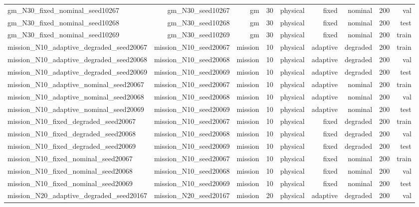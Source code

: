 \begin{tabular}{lrrrrrrrr}
gm\_N30\_fixed\_nominal\_seed10267 & gm\_N30\_seed10267 & gm & 30 & physical & fixed & nominal & 200 & val \\
gm\_N30\_fixed\_nominal\_seed10268 & gm\_N30\_seed10268 & gm & 30 & physical & fixed & nominal & 200 & test \\
gm\_N30\_fixed\_nominal\_seed10269 & gm\_N30\_seed10269 & gm & 30 & physical & fixed & nominal & 200 & train \\
mission\_N10\_adaptive\_degraded\_seed20067 & mission\_N10\_seed20067 & mission & 10 & physical & adaptive & degraded & 200 & train \\
mission\_N10\_adaptive\_degraded\_seed20068 & mission\_N10\_seed20068 & mission & 10 & physical & adaptive & degraded & 200 & val \\
mission\_N10\_adaptive\_degraded\_seed20069 & mission\_N10\_seed20069 & mission & 10 & physical & adaptive & degraded & 200 & test \\
mission\_N10\_adaptive\_nominal\_seed20067 & mission\_N10\_seed20067 & mission & 10 & physical & adaptive & nominal & 200 & train \\
mission\_N10\_adaptive\_nominal\_seed20068 & mission\_N10\_seed20068 & mission & 10 & physical & adaptive & nominal & 200 & val \\
mission\_N10\_adaptive\_nominal\_seed20069 & mission\_N10\_seed20069 & mission & 10 & physical & adaptive & nominal & 200 & test \\
mission\_N10\_fixed\_degraded\_seed20067 & mission\_N10\_seed20067 & mission & 10 & physical & fixed & degraded & 200 & train \\
mission\_N10\_fixed\_degraded\_seed20068 & mission\_N10\_seed20068 & mission & 10 & physical & fixed & degraded & 200 & val \\
mission\_N10\_fixed\_degraded\_seed20069 & mission\_N10\_seed20069 & mission & 10 & physical & fixed & degraded & 200 & test \\
mission\_N10\_fixed\_nominal\_seed20067 & mission\_N10\_seed20067 & mission & 10 & physical & fixed & nominal & 200 & train \\
mission\_N10\_fixed\_nominal\_seed20068 & mission\_N10\_seed20068 & mission & 10 & physical & fixed & nominal & 200 & val \\
mission\_N10\_fixed\_nominal\_seed20069 & mission\_N10\_seed20069 & mission & 10 & physical & fixed & nominal & 200 & test \\
mission\_N20\_adaptive\_degraded\_seed20167 & mission\_N20\_seed20167 & mission & 20 & physical & adaptive & degraded & 200 & val \\

\end{tabular}
